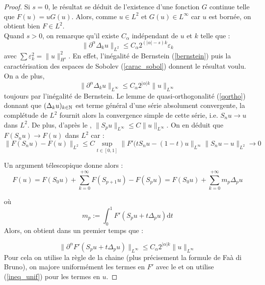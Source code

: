 \documentclass[11pt,a4paper]{article}
\begin{document}
\begin{proof}
Si $s=0$, le résultat se déduit de l'existence d'une fonction $G$ continue telle que $F(u)=uG(u)$. Alors, comme $u\in L^2$ et $G(u) \in L^{\infty}$ car $u$ est bornée, on obtient bien $F\in L^2$. \\
Quand $s>0$, on remarque qu'il existe $C_\alpha$  indépendant de $u$ et $k$ telle que  : 
\begin{equation}
\|\partial^\alpha \Delta_k u \|_{L^2} \leq C_\alpha 2^{(|\alpha|-s)k} \varepsilon_k
\end{equation}
avec $\sum \varepsilon_k^2 =  \|u\|_{H^s}^2$. En effet, l'inégalité de Bernstein (\ref{bernstein}) puis la caractérisation des espaces de Sobolev (\ref{carac_sobol}) donnent le résultat voulu. On a de plus,
\begin{equation}\label{ineq_unif}
\|\partial^\alpha \Delta_k u \|_{L^{\infty}} \leq C_\alpha 2^{|\alpha|k} \|u\|_{L^{\infty}}
\end{equation}
toujours par l'inégalité de Bernstein. Le lemme de quasi-orthogonalité (\ref{qortho}) donnant que $(\Delta_k u)_{k\in \mathbb N}$ est terme général d'une série absolument convergente, la complétude de $L^2$ fournit alors la convergence simple de cette série, i.e. $S_nu \to u$ dans $L^2$. De plus, d'après le ,  $\|S_pu\|_{L^\infty} \leq C \|u\|_{L^\infty}$. On en déduit que $F(S_nu) \to F(u)$ dans $L^2$ car :
\[ \| F(S_nu) - F(u)\|_{L^2} \leq C \sup_{t\in[0,1]} \|F'(tS_nu- (1-t)u \|_{L^\infty}\|S_nu-u\|_{L^2} \to 0 \]

Un argument télescopique donne alors : 
\begin{equation*}
F(u) = F(S_0 u) + \sum_{k=0}^{+\infty} F(S_{p+1} u) - F(S_p u) = F(S_0 u) + \sum_{k=0}^{+\infty} m_p \Delta_p u
\end{equation*}

où \[m_p := \int_0^1 F'(S_pu + t\Delta_pu)\mathrm{d}t\]
Alors, on obtient dans un premier temps que : 

\begin{equation*}
\| \partial^\alpha F'(S_pu + t\Delta_pu)\|_{L^{\infty}} \leq C_\alpha 2^{|\alpha|k} \|u\|_{L^{\infty}}
\end{equation*}
Pour cela on utilise la règle de la chaine (plus précisement la formule de Faà di Bruno), on majore uniformément les termes en $F'$ avec le  et on utilise (\ref{ineq_unif}) pour les termes en $u$.



\end{proof}


\newpage
\printbibliography[heading=bibintoc, title={Références}]
\end{document}
